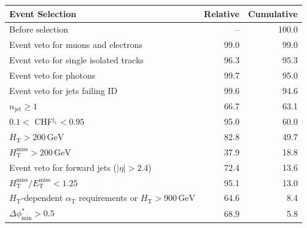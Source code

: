 \begin{table}[p]
    \begin{center}
        \begin{tabular}{lrr}
      \hline
                                                                                               Event Selection &  Relative &  Cumulative \\
      \hline
                                                                                             Before selection  &         -- &      100.0 \\
                                                                            Event veto for muons and electrons &       99.0 &       99.0 \\
                                                                         Event veto for single isolated tracks &       96.3 &       95.3 \\
                                                                                        Event veto for photons &       99.7 &       95.0 \\
                                                                                Event veto for jets failing ID &       99.6 &       94.6 \\
                                                                                     $n_{\mathrm{jet}} \geq 1$ &       66.7 &       63.1 \\
                                                                           $0.1 <$ CHF$^{\mathrm{j_1}} < 0.95$ &       95.0 &       60.0 \\
                                                                          $H_{\mathrm{T}} > 200\,\mathrm{GeV}$ &       82.8 &       49.7 \\
                                                          $H_{\mathrm{T}}^{\mathrm{miss}} > 200\,\mathrm{GeV}$ &       37.9 &       18.8 \\
                                                                  Event veto for forward jets ($|\eta| > 2.4$) &       72.4 &       13.6 \\
                                      $H_{\mathrm{T}}^{\mathrm{miss}} / E_{\mathrm{T}}^{\mathrm{miss}} < 1.25$ &       95.1 &       13.0 \\
         $H_{\mathrm{T}}$-dependent $\alpha_{\mathrm{T}}$ requirements or $H_{\mathrm{T}} > 900\,\mathrm{GeV}$ &       64.6 &        8.4 \\
                                                                         $\Delta\phi^{*}_{\mathrm{min}} > 0.5$ &       68.9 &        5.8 \\

\end{tabular}
\end{center}
\end{table}
